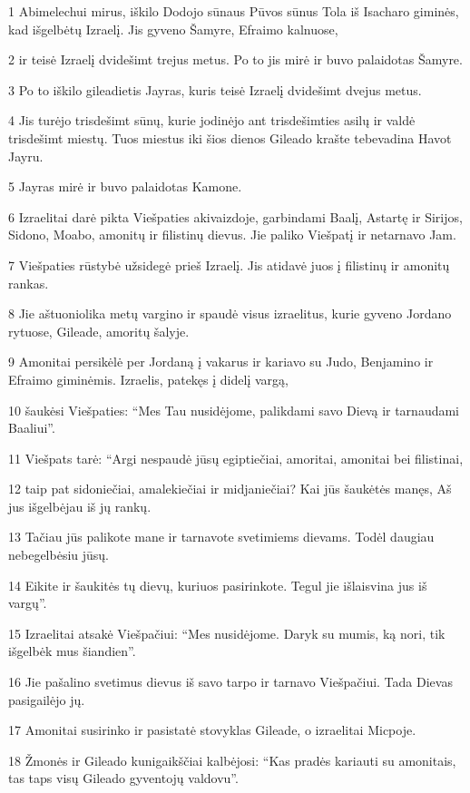 \par 1 Abimelechui mirus, iškilo Dodojo sūnaus Pūvos sūnus Tola iš Isacharo giminės, kad išgelbėtų Izraelį. Jis gyveno Šamyre, Efraimo kalnuose, 
\par 2 ir teisė Izraelį dvidešimt trejus metus. Po to jis mirė ir buvo palaidotas Šamyre. 
\par 3 Po to iškilo gileadietis Jayras, kuris teisė Izraelį dvidešimt dvejus metus. 
\par 4 Jis turėjo trisdešimt sūnų, kurie jodinėjo ant trisdešimties asilų ir valdė trisdešimt miestų. Tuos miestus iki šios dienos Gileado krašte tebevadina Havot Jayru. 
\par 5 Jayras mirė ir buvo palaidotas Kamone. 
\par 6 Izraelitai darė pikta Viešpaties akivaizdoje, garbindami Baalį, Astartę ir Sirijos, Sidono, Moabo, amonitų ir filistinų dievus. Jie paliko Viešpatį ir netarnavo Jam. 
\par 7 Viešpaties rūstybė užsidegė prieš Izraelį. Jis atidavė juos į filistinų ir amonitų rankas. 
\par 8 Jie aštuoniolika metų vargino ir spaudė visus izraelitus, kurie gyveno Jordano rytuose, Gileade, amoritų šalyje. 
\par 9 Amonitai persikėlė per Jordaną į vakarus ir kariavo su Judo, Benjamino ir Efraimo giminėmis. Izraelis, patekęs į didelį vargą, 
\par 10 šaukėsi Viešpaties: “Mes Tau nusidėjome, palikdami savo Dievą ir tarnaudami Baaliui”. 
\par 11 Viešpats tarė: “Argi nespaudė jūsų egiptiečiai, amoritai, amonitai bei filistinai, 
\par 12 taip pat sidoniečiai, amalekiečiai ir midjaniečiai? Kai jūs šaukėtės manęs, Aš jus išgelbėjau iš jų rankų. 
\par 13 Tačiau jūs palikote mane ir tarnavote svetimiems dievams. Todėl daugiau nebegelbėsiu jūsų. 
\par 14 Eikite ir šaukitės tų dievų, kuriuos pasirinkote. Tegul jie išlaisvina jus iš vargų”. 
\par 15 Izraelitai atsakė Viešpačiui: “Mes nusidėjome. Daryk su mumis, ką nori, tik išgelbėk mus šiandien”. 
\par 16 Jie pašalino svetimus dievus iš savo tarpo ir tarnavo Viešpačiui. Tada Dievas pasigailėjo jų. 
\par 17 Amonitai susirinko ir pasistatė stovyklas Gileade, o izraelitai­ Micpoje. 
\par 18 Žmonės ir Gileado kunigaikščiai kalbėjosi: “Kas pradės kariauti su amonitais, tas taps visų Gileado gyventojų valdovu”.



